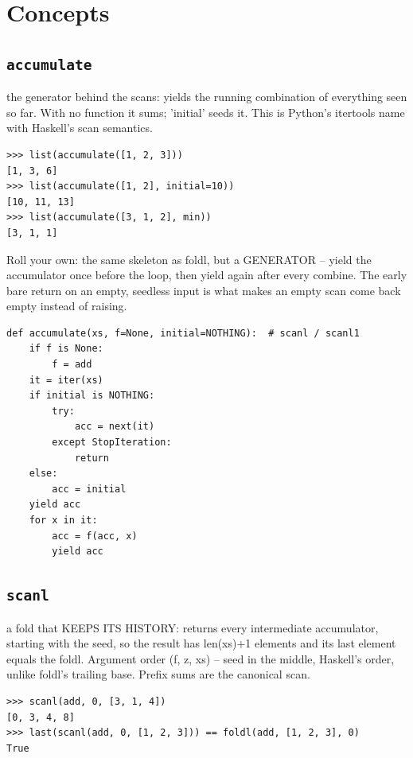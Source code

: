 \documentclass[10pt,letterpaper]{book}
\begin{document}
\section{Concepts}
\subsection{\texttt{accumulate}}\label{def:accumulate}
the generator behind the scans: yields the running combination of everything seen so far. With no function it sums; 'initial' seeds it. This is Python's itertools name with Haskell's scan semantics.
\begin{lstlisting}[style=ex]
>>> list(accumulate([1, 2, 3]))
[1, 3, 6]
>>> list(accumulate([1, 2], initial=10))
[10, 11, 13]
>>> list(accumulate([3, 1, 2], min))
[3, 1, 1]
\end{lstlisting}

Roll your own: the same skeleton as foldl, but a GENERATOR -- yield the accumulator once before the loop, then yield again after every combine. The early bare return on an empty, seedless input is what makes an empty scan come back empty instead of raising.

\begin{lstlisting}[style=ex]
def accumulate(xs, f=None, initial=NOTHING):  # scanl / scanl1
    if f is None:
        f = add
    it = iter(xs)
    if initial is NOTHING:
        try:
            acc = next(it)
        except StopIteration:
            return
    else:
        acc = initial
    yield acc
    for x in it:
        acc = f(acc, x)
        yield acc
\end{lstlisting}

\subsection{\texttt{scanl}}\label{def:scanl}
a fold that KEEPS ITS HISTORY: returns every intermediate accumulator, starting with the seed, so the result has len(xs)+1 elements and its last element equals the foldl. Argument order (f, z, xs) -- seed in the middle, Haskell's order, unlike foldl's trailing base. Prefix sums are the canonical scan.
\begin{lstlisting}[style=ex]
>>> scanl(add, 0, [3, 1, 4])
[0, 3, 4, 8]
>>> last(scanl(add, 0, [1, 2, 3])) == foldl(add, [1, 2, 3], 0)
True
\end{lstlisting}
\end{document}
